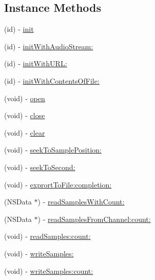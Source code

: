 \subsection*{Instance Methods}
\begin{DoxyCompactItemize}
\item 
(id) -\/ \hyperlink{interface_s_e_audio_stream_adfb80527c355e64279d60a7b1af838ea}{init}
\item 
(id) -\/ \hyperlink{interface_s_e_audio_stream_a34663b1bbae1fdb5e32111a6629a994a}{init\-With\-Audio\-Stream\-:}
\item 
(id) -\/ \hyperlink{interface_s_e_audio_stream_a7acd0370d5f5066a6d00834af0eea200}{init\-With\-U\-R\-L\-:}
\item 
(id) -\/ \hyperlink{interface_s_e_audio_stream_a88b28dfe93892a08d261bd946beea26f}{init\-With\-Contents\-Of\-File\-:}
\item 
(void) -\/ \hyperlink{interface_s_e_audio_stream_add81dd9d9bd838f3a5dc1ceae94ccf26}{open}
\item 
(void) -\/ \hyperlink{interface_s_e_audio_stream_a8c4af367964e8be4817df12989f06d40}{close}
\item 
(void) -\/ \hyperlink{interface_s_e_audio_stream_ae59699f3f9cdf5fa000d9835da89e73e}{clear}
\item 
(void) -\/ \hyperlink{interface_s_e_audio_stream_a1dd26e76fbcd65f2d221f61de75fd3eb}{seek\-To\-Sample\-Position\-:}
\item 
(void) -\/ \hyperlink{interface_s_e_audio_stream_a720083efde7839f0a44ec7456805ffeb}{seek\-To\-Second\-:}
\item 
(void) -\/ \hyperlink{interface_s_e_audio_stream_ab721ccfe6c59695b85abc3fe00b37230}{exprort\-To\-File\-:completion\-:}
\item 
(N\-S\-Data $\ast$) -\/ \hyperlink{interface_s_e_audio_stream_a8d848d7a388d38fb670eb92e3bf6566d}{read\-Samples\-With\-Count\-:}
\item 
(N\-S\-Data $\ast$) -\/ \hyperlink{interface_s_e_audio_stream_a4501c22126f23cc1cb9ecbd1d7ddda6e}{read\-Samples\-From\-Channel\-:count\-:}
\item 
(void) -\/ \hyperlink{interface_s_e_audio_stream_ac80704c916ddbac8f8309f3a6a019e80}{read\-Samples\-:count\-:}
\item 
(void) -\/ \hyperlink{interface_s_e_audio_stream_ab184f74429643065a116a8f272bf79b3}{write\-Samples\-:}
\item 
(void) -\/ \hyperlink{interface_s_e_audio_stream_af19a129d2a78172d771f2552dd97f49b}{write\-Samples\-:count\-:}
\end{DoxyCompactItemize}
